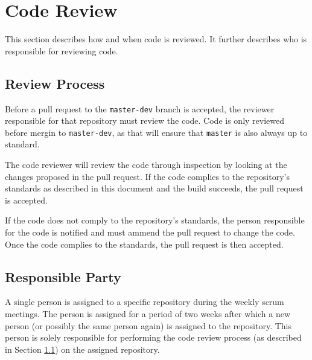 \documentclass{article}
\begin{document}
    \section{Code Review}
    \label{sec:review}

    This section describes how and when code is reviewed. It further describes
    who is responsible for reviewing code.

    \subsection{Review Process}
    \label{sec:review-proc}

    Before a pull request to the \texttt{master-dev} branch is accepted, the
    reviewer responsible for that repository must review the code. Code is
    only reviewed before mergin to \texttt{master-dev}, as that will ensure
    that \texttt{master} is also always up to standard.

    The code reviewer will review the code through inspection by looking at the
    changes proposed in the pull request. If the code complies to the
    repository's standards as described in this document and the build succeeds,
    the pull request is accepted.

    If the code does not comply to the repository's standards, the person
    responsible for the code is notified and must ammend the pull request to
    change the code. Once the code complies to the standards, the pull
    request is then accepted.

    \subsection{Responsible Party}
    \label{sec:review-party}

    A single person is assigned to a specific repository during the weekly scrum
    meetings. The person is assigned for a period of two weeks after which a new
    person (or possibly the same person again) is assigned to the repository.
    This person is solely responsible for performing the code review process (as
    described in Section \ref{sec:review-proc}) on the assigned repository.
\end{document}
